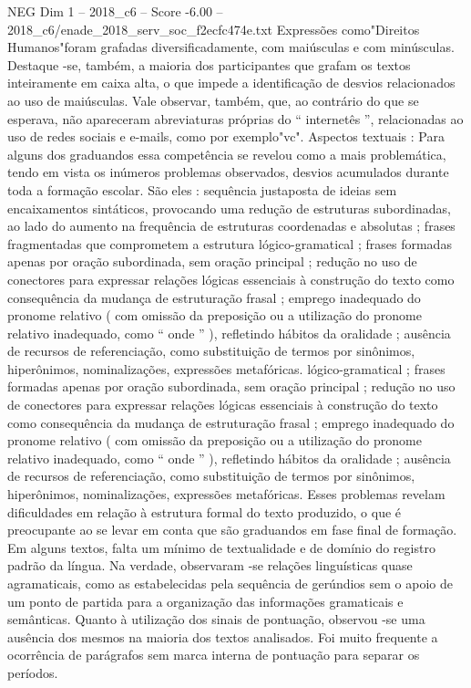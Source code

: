 \begin{textsample}{NEG Dim 1 – 2018\_c6 – Score -6.00 – 2018\_c6/enade\_2018\_serv\_soc\_f2ecfc474e.txt}
Expressões como"Direitos Humanos"foram grafadas diversificadamente, com maiúsculas e com minúsculas.
Destaque -se, também, a maioria dos participantes que grafam os textos inteiramente em caixa alta, o que impede a identificação de desvios relacionados ao uso de maiúsculas.
Vale observar, também, que, ao contrário do que se esperava, não apareceram abreviaturas próprias do “ internetês ”, relacionadas ao uso de redes sociais e e-mails, como por exemplo"vc".
Aspectos textuais : Para alguns dos graduandos essa competência se revelou como a mais problemática, tendo em vista os inúmeros problemas observados, desvios acumulados durante toda a formação escolar.
São eles : sequência justaposta de ideias sem encaixamentos sintáticos, provocando uma redução de estruturas subordinadas, ao lado do aumento na frequência de estruturas coordenadas e absolutas ; frases fragmentadas que comprometem a estrutura lógico-gramatical ; frases formadas apenas por oração subordinada, sem oração principal ; redução no uso de conectores para expressar relações lógicas essenciais à construção do texto como consequência da mudança de estruturação frasal ; emprego inadequado do pronome relativo ( com omissão da preposição ou a utilização do pronome relativo inadequado, como “ onde ” ), refletindo hábitos da oralidade ; ausência de recursos de referenciação, como substituição de termos por sinônimos, hiperônimos, nominalizações, expressões metafóricas. lógico-gramatical ; frases formadas apenas por oração subordinada, sem oração principal ; redução no uso de conectores para expressar relações lógicas essenciais à construção do texto como consequência da mudança de estruturação frasal ; emprego inadequado do pronome relativo ( com omissão da preposição ou a utilização do pronome relativo inadequado, como “ onde ” ), refletindo hábitos da oralidade ; ausência de recursos de referenciação, como substituição de termos por sinônimos, hiperônimos, nominalizações, expressões metafóricas.
Esses problemas revelam dificuldades em relação à estrutura formal do texto produzido, o que é preocupante ao se levar em conta que são graduandos em fase final de formação.
Em alguns textos, falta um mínimo de textualidade e de domínio do registro padrão da língua.
Na verdade, observaram -se relações linguísticas quase agramaticais, como as estabelecidas pela sequência de gerúndios sem o apoio de um ponto de partida para a organização das informações gramaticais e semânticas.
Quanto à utilização dos sinais de pontuação, observou -se uma ausência dos mesmos na maioria dos textos analisados.
Foi muito frequente a ocorrência de parágrafos sem marca interna de pontuação para separar os períodos.

\end{textsample}
